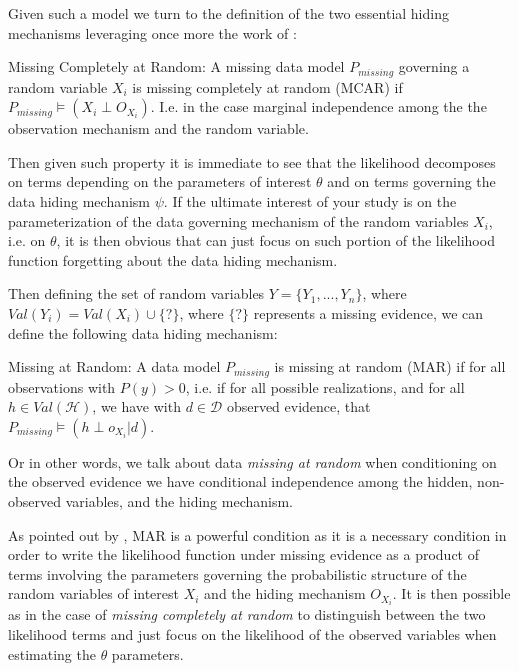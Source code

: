 \documentclass[11pt]{article}
\begin{document}
\begin{article}
Given such a model we turn to the definition of the two essential
hiding mechanisms leveraging once more the work of \cite{koller2009probabilistic}:

\begin{definition}
Missing Completely at Random: A missing data model $P_{missing}$ governing a
random variable $X_i$ is missing
completely at random (MCAR) if $P_{missing} \models (X_i \perp O_{X_i})$.
I.e. in the case marginal independence among the the observation mechanism
and the random variable.
\end{definition}  

Then given such property it is immediate to see that the likelihood
decomposes on terms depending on the parameters of interest
\(\theta\) and on terms governing the data hiding mechanism
\(\psi\). If the ultimate interest of your study is on the
parameterization of the data governing mechanism of the random
variables \(X_i\), i.e. on \(\theta\), it is then obvious that can just
focus on such portion of the likelihood function forgetting about
the data hiding mechanism.

Then defining the set of random variables \(Y = \{Y_1, . . . , Y_n\}\),
where \(Val(Y_i) = Val(X_i) \cup \{?\}\), where \(\{?\}\) represents a
missing evidence, we can define the following data hiding mechanism:

\begin{definition}
Missing at Random: A data model $P_{missing}$ is missing at random (MAR)
if for all observations with $P(y) > 0$, i.e. if for all possible realizations,
and for all $h \in Val(\mathscr{H})$, we have with $d \in \mathscr{D}$
observed evidence, that $ P_{missing} \models (h \perp o_{X_i} | d) $.
\end{definition}  

Or in other words, we talk about data \emph{missing at random} when
conditioning on the observed evidence we have conditional
independence among the hidden, non-observed variables, and the
hiding mechanism.

As pointed out by \cite{koller2009probabilistic}, MAR is a powerful
condition as it is a necessary condition in order to write the
likelihood function under missing evidence as a product of terms
involving the parameters governing the probabilistic structure of
the random variables of interest \(X_i\) and the hiding mechanism
\(O_{X_i}\). It is then possible as in the case of \emph{missing completely
at random} to distinguish between the two likelihood terms and just
focus on the likelihood of the observed variables when estimating
the \(\theta\) parameters.


\end{article}
\end{document}
